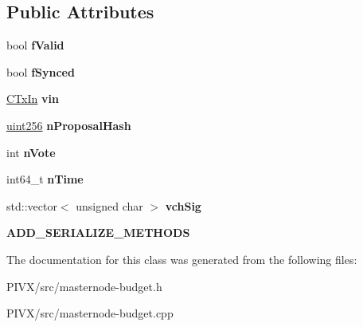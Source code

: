 \subsection*{Public Attributes}
\begin{DoxyCompactItemize}
\item 
\mbox{\label{class_c_budget_vote_a069471bf430ecee3065929591dc47aba}} 
bool {\bfseries f\+Valid}
\item 
\mbox{\label{class_c_budget_vote_ada87c71869d08d9869c5739f4a5b626e}} 
bool {\bfseries f\+Synced}
\item 
\mbox{\label{class_c_budget_vote_a335d3b479d57994097eccb52b50cbe53}} 
\mbox{\hyperlink{class_c_tx_in}{C\+Tx\+In}} {\bfseries vin}
\item 
\mbox{\label{class_c_budget_vote_a185648d07f641e8d663afcbf7a7c1a24}} 
\mbox{\hyperlink{classuint256}{uint256}} {\bfseries n\+Proposal\+Hash}
\item 
\mbox{\label{class_c_budget_vote_a6eafe2cf4bca2b25d5662b2601334a8d}} 
int {\bfseries n\+Vote}
\item 
\mbox{\label{class_c_budget_vote_a7cde3552eacf54d86796d3ff48601125}} 
int64\+\_\+t {\bfseries n\+Time}
\item 
\mbox{\label{class_c_budget_vote_abe31c3e9d62a7254550030f2b67643d7}} 
std\+::vector$<$ unsigned char $>$ {\bfseries vch\+Sig}
\item 
\mbox{\label{class_c_budget_vote_a9d6b5f88ab856880bd384a7733e3436f}} 
{\bfseries A\+D\+D\+\_\+\+S\+E\+R\+I\+A\+L\+I\+Z\+E\+\_\+\+M\+E\+T\+H\+O\+DS}
\end{DoxyCompactItemize}


The documentation for this class was generated from the following files\+:\begin{DoxyCompactItemize}
\item 
P\+I\+V\+X/src/masternode-\/budget.\+h\item 
P\+I\+V\+X/src/masternode-\/budget.\+cpp\end{DoxyCompactItemize}

